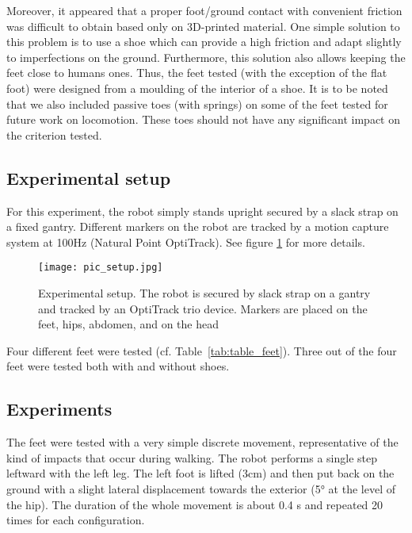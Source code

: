 Moreover, it appeared that a proper foot/ground contact with convenient friction was difficult to obtain based only on 3D-printed material. One simple solution to this problem is to use a shoe which can provide a high friction and adapt slightly to imperfections on the ground. Furthermore, this solution also allows keeping the feet close to humans ones. Thus, the feet tested (with the exception of the flat foot) were designed from a moulding of the interior of a shoe. It is to be noted that we also included passive toes (with springs) on some of the feet tested for future work on locomotion. These toes should not have any significant impact on the criterion tested.


\subsection{Experimental setup} %
\label{sub:experimental_setup}

For this experiment, the robot simply stands upright secured by a slack strap on a fixed gantry. Different markers on the robot are tracked by a motion capture system at 100Hz (Natural Point OptiTrack). See figure \ref{fig:setup} for more details.

\begin{figure}[ht]
    \begin{center}
        \texttt{[image: pic\_setup.jpg]}
    \end{center}
    \caption{Experimental setup. The robot is secured by slack strap on a gantry and tracked by an OptiTrack trio device. Markers are placed on the feet, hips, abdomen, and on the head}
    \label{fig:setup}
\end{figure}

Four different feet were tested (cf. Table~\ref{tab:table_feet}). Three out of the four feet were tested both with and without shoes.


\subsection{Experiments} %

The feet were tested with a very simple discrete movement, representative of the kind of impacts that occur during walking. The robot performs a single step leftward with the left leg. The left foot is lifted (3cm) and then put back on the ground with a slight lateral displacement towards the exterior (5° at the level of the hip). The duration  of the whole movement is about 0.4 s and repeated 20 times for each configuration.


